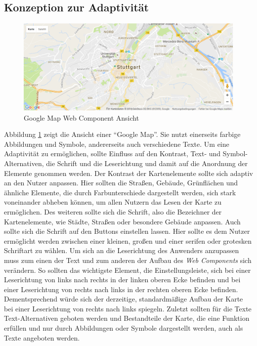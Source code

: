 \documentclass[12pt, paper=a4, bibtotoc, toc=listof, headsepline=true]{scrreprt}
\begin{document}
	\subsection{Konzeption zur Adaptivität}
	\label{ref:konVonAda}
	\begin{figure}			\centering
		\includegraphics[width=\textwidth,height=\textheight,keepaspectratio]{gmap.png}
		\caption[Google Map Web Component]{Google Map Web Component Ansicht}
		\label{img:gmap}
	\end{figure}
	Abbildung \ref{img:gmap} zeigt die Ansicht einer \enquote{Google Map}. Sie nutzt einerseits farbige Abbildungen und Symbole, andererseits auch verschiedene Texte. Um eine Adaptivität zu ermöglichen, sollte Einfluss auf den Kontrast, Text- und Symbol-Alternativen, die Schrift und die Leserichtung und damit auf die Anordnung der Elemente genommen werden. Der Kontrast der Kartenelemente sollte sich adaptiv an den Nutzer anpassen. Hier sollten die Straßen, Gebäude, Grünflächen und ähnliche Elemente, die durch Farbunterschiede dargestellt werden, sich stark voneinander abheben können, um allen Nutzern das Lesen der Karte zu ermöglichen. Des weiteren sollte sich die Schrift, also die Bezeichner der Kartenelemente, wie Städte, Straßen oder besondere Gebäude anpassen. Auch sollte sich die Schrift auf den Buttons einstellen lassen. Hier sollte es dem Nutzer ermöglicht werden zwischen einer kleinen, großen und einer serifen oder grotesken Schriftart zu wählen. Um sich an die Leserichtung des Anwenders anzupassen muss zum einen der Text und zum anderen der Aufbau des \emph{Web Components} sich verändern. So sollten das wichtigste Element, die Einstellungsleiste, sich bei einer Leserichtung von links nach rechts in der linken oberen Ecke befinden und bei einer Leserichtung von rechts nach links in der rechten oberen Ecke befinden. Dementsprechend würde sich der derzeitige, standardmäßige Aufbau der Karte bei einer Leserichtung von rechts nach links spiegeln. Zuletzt sollten für die Texte Text-Alternativen geboten werden und Bestandteile der Karte, die eine Funktion erfüllen und nur durch Abbildungen oder Symbole dargestellt werden, auch als Texte angeboten werden. 
\end{document}
